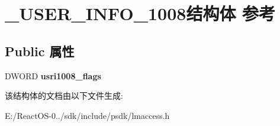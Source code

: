 \hypertarget{struct___u_s_e_r___i_n_f_o__1008}{}\section{\+\_\+\+U\+S\+E\+R\+\_\+\+I\+N\+F\+O\+\_\+1008结构体 参考}
\label{struct___u_s_e_r___i_n_f_o__1008}
\subsection*{Public 属性}
\begin{DoxyCompactItemize}
\item 
\mbox{\label{struct___u_s_e_r___i_n_f_o__1008_a1aa0347e992b18c8a58aeb3ce14dc131}} 
D\+W\+O\+RD {\bfseries usri1008\+\_\+flags}
\end{DoxyCompactItemize}


该结构体的文档由以下文件生成\+:\begin{DoxyCompactItemize}
\item 
E\+:/\+React\+O\+S-\/0../sdk/include/psdk/lmaccess.\+h\end{DoxyCompactItemize}

